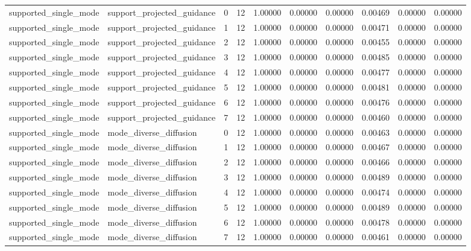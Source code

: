 \documentclass{article}
\begin{document}
\begin{table}[tbp]
{\begin{tabular}{llllllllll}
supported\_single\_mode & support\_projected\_guidance & 0 & 12 & 1.00000 & 0.00000 & 0.00000 & 0.00469 & 0.00000 & 0.00000 \\
supported\_single\_mode & support\_projected\_guidance & 1 & 12 & 1.00000 & 0.00000 & 0.00000 & 0.00471 & 0.00000 & 0.00000 \\
supported\_single\_mode & support\_projected\_guidance & 2 & 12 & 1.00000 & 0.00000 & 0.00000 & 0.00455 & 0.00000 & 0.00000 \\
supported\_single\_mode & support\_projected\_guidance & 3 & 12 & 1.00000 & 0.00000 & 0.00000 & 0.00485 & 0.00000 & 0.00000 \\
supported\_single\_mode & support\_projected\_guidance & 4 & 12 & 1.00000 & 0.00000 & 0.00000 & 0.00477 & 0.00000 & 0.00000 \\
supported\_single\_mode & support\_projected\_guidance & 5 & 12 & 1.00000 & 0.00000 & 0.00000 & 0.00481 & 0.00000 & 0.00000 \\
supported\_single\_mode & support\_projected\_guidance & 6 & 12 & 1.00000 & 0.00000 & 0.00000 & 0.00476 & 0.00000 & 0.00000 \\
supported\_single\_mode & support\_projected\_guidance & 7 & 12 & 1.00000 & 0.00000 & 0.00000 & 0.00460 & 0.00000 & 0.00000 \\
supported\_single\_mode & mode\_diverse\_diffusion & 0 & 12 & 1.00000 & 0.00000 & 0.00000 & 0.00463 & 0.00000 & 0.00000 \\
supported\_single\_mode & mode\_diverse\_diffusion & 1 & 12 & 1.00000 & 0.00000 & 0.00000 & 0.00467 & 0.00000 & 0.00000 \\
supported\_single\_mode & mode\_diverse\_diffusion & 2 & 12 & 1.00000 & 0.00000 & 0.00000 & 0.00466 & 0.00000 & 0.00000 \\
supported\_single\_mode & mode\_diverse\_diffusion & 3 & 12 & 1.00000 & 0.00000 & 0.00000 & 0.00489 & 0.00000 & 0.00000 \\
supported\_single\_mode & mode\_diverse\_diffusion & 4 & 12 & 1.00000 & 0.00000 & 0.00000 & 0.00474 & 0.00000 & 0.00000 \\
supported\_single\_mode & mode\_diverse\_diffusion & 5 & 12 & 1.00000 & 0.00000 & 0.00000 & 0.00489 & 0.00000 & 0.00000 \\
supported\_single\_mode & mode\_diverse\_diffusion & 6 & 12 & 1.00000 & 0.00000 & 0.00000 & 0.00478 & 0.00000 & 0.00000 \\
supported\_single\_mode & mode\_diverse\_diffusion & 7 & 12 & 1.00000 & 0.00000 & 0.00000 & 0.00461 & 0.00000 & 0.00000 \\

\end{tabular}}
\end{table}
\end{document}
